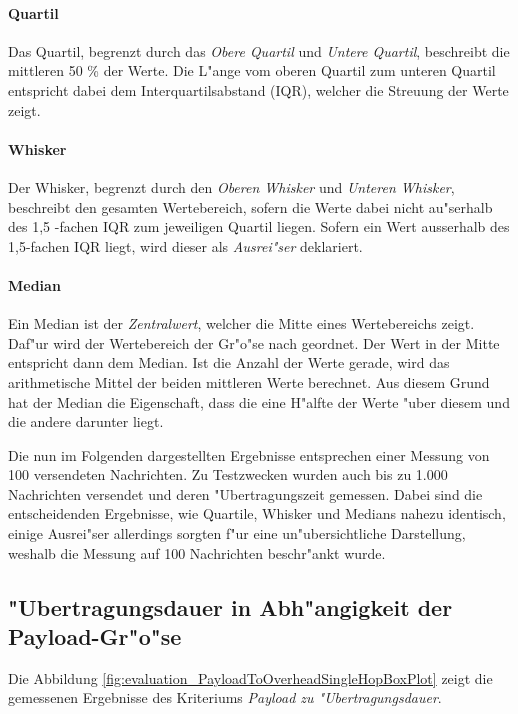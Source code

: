 
\paragraph{Quartil}
Das Quartil, begrenzt durch das \emph{Obere Quartil} und \emph{Untere Quartil}, beschreibt die mittleren 50 \% der Werte. Die L"ange vom oberen Quartil zum unteren Quartil entspricht dabei dem Interquartilsabstand (IQR), welcher die Streuung der Werte zeigt.
\paragraph{Whisker}
Der Whisker, begrenzt durch den \emph{Oberen Whisker} und \emph{Unteren Whisker}, beschreibt den gesamten Wertebereich, sofern die Werte dabei nicht au"serhalb des 1,5 -fachen IQR zum jeweiligen Quartil liegen. Sofern ein Wert ausserhalb des 1,5-fachen IQR liegt, wird dieser als \emph{Ausrei"ser} deklariert.
\paragraph{Median}
Ein Median ist der \emph{Zentralwert}, welcher die Mitte eines Wertebereichs zeigt. Daf"ur wird der Wertebereich der Gr"o"se nach geordnet. Der Wert in der Mitte entspricht dann dem Median. Ist die Anzahl der Werte gerade, wird das arithmetische Mittel der beiden mittleren Werte berechnet. Aus diesem Grund hat der Median die Eigenschaft, dass die eine H"alfte der Werte "uber diesem und die andere darunter liegt.

Die nun im Folgenden dargestellten Ergebnisse entsprechen einer Messung von 100 versendeten Nachrichten. Zu Testzwecken wurden auch bis zu 1.000 Nachrichten versendet und deren "Ubertragungszeit gemessen. Dabei sind die entscheidenden Ergebnisse, wie Quartile, Whisker und Medians nahezu identisch, einige Ausrei"ser allerdings sorgten f"ur eine un"ubersichtliche Darstellung, weshalb die Messung auf 100 Nachrichten beschr"ankt wurde.

\subsection{"Ubertragungsdauer in Abh"angigkeit der Payload-Gr"o"se}


Die Abbildung \ref{fig:evaluation_PayloadToOverheadSingleHopBoxPlot} zeigt die gemessenen Ergebnisse des Kriteriums \emph{Payload zu "Ubertragungsdauer}.

